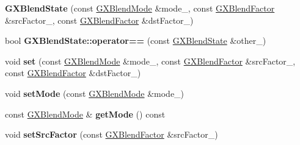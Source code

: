 \begin{DoxyCompactItemize}
\item 
{\bfseries G\+X\+Blend\+State} (const \hyperlink{class_magnum_1_1_g_x_blend_mode}{G\+X\+Blend\+Mode} \&mode\+\_\+, const \hyperlink{class_magnum_1_1_g_x_blend_factor}{G\+X\+Blend\+Factor} \&src\+Factor\+\_\+, const \hyperlink{class_magnum_1_1_g_x_blend_factor}{G\+X\+Blend\+Factor} \&dst\+Factor\+\_\+)\hypertarget{class_magnum_1_1_g_x_blend_state_a38a1b24eef6427491f9cad4e22ba854b}{}\label{class_magnum_1_1_g_x_blend_state_a38a1b24eef6427491f9cad4e22ba854b}

\item 
bool {\bfseries G\+X\+Blend\+State\+::operator==} (const \hyperlink{class_magnum_1_1_g_x_blend_state}{G\+X\+Blend\+State} \&other\+\_\+)\hypertarget{class_magnum_1_1_g_x_blend_state_a71bc3dfc01b71214c8b313db02bd7663}{}\label{class_magnum_1_1_g_x_blend_state_a71bc3dfc01b71214c8b313db02bd7663}

\item 
void {\bfseries set} (const \hyperlink{class_magnum_1_1_g_x_blend_mode}{G\+X\+Blend\+Mode} \&mode\+\_\+, const \hyperlink{class_magnum_1_1_g_x_blend_factor}{G\+X\+Blend\+Factor} \&src\+Factor\+\_\+, const \hyperlink{class_magnum_1_1_g_x_blend_factor}{G\+X\+Blend\+Factor} \&dst\+Factor\+\_\+)\hypertarget{class_magnum_1_1_g_x_blend_state_ae23e7579b9e77ff0c019703ca62c44d4}{}\label{class_magnum_1_1_g_x_blend_state_ae23e7579b9e77ff0c019703ca62c44d4}

\item 
void {\bfseries set\+Mode} (const \hyperlink{class_magnum_1_1_g_x_blend_mode}{G\+X\+Blend\+Mode} \&mode\+\_\+)\hypertarget{class_magnum_1_1_g_x_blend_state_a778dd42d95bc2fa44d024c42d3026f58}{}\label{class_magnum_1_1_g_x_blend_state_a778dd42d95bc2fa44d024c42d3026f58}

\item 
const \hyperlink{class_magnum_1_1_g_x_blend_mode}{G\+X\+Blend\+Mode} \& {\bfseries get\+Mode} () const \hypertarget{class_magnum_1_1_g_x_blend_state_a9025e756fbd077be555fad27266f14c1}{}\label{class_magnum_1_1_g_x_blend_state_a9025e756fbd077be555fad27266f14c1}

\item 
void {\bfseries set\+Src\+Factor} (const \hyperlink{class_magnum_1_1_g_x_blend_factor}{G\+X\+Blend\+Factor} \&src\+Factor\+\_\+)\hypertarget{class_magnum_1_1_g_x_blend_state_a2dbcfe28643ae82cfe729b5d338d0542}{}\label{class_magnum_1_1_g_x_blend_state_a2dbcfe28643ae82cfe729b5d338d0542}


\end{DoxyCompactItemize}
